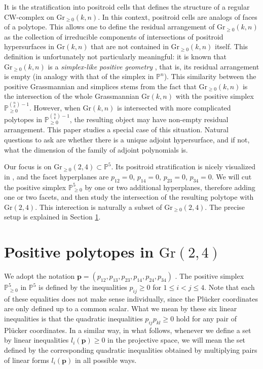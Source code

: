 \documentclass[12pt]{extarticle}
\theoremstyle{definition}
\begin{document}
It is the stratification into positroid cells that defines the structure of a regular CW-complex on $\mathrm{Gr}_{\geq 0}(k,n)$. In this context, positroid cells are analogs of faces of a polytope. This allows one to define the residual arrangement of $\mathrm{Gr}_{\geq 0}(k,n)$ as the collection of irreducible components of intersections of positroid hypersurfaces in $\mathrm{Gr}(k,n)$ that are not contained in $\mathrm{Gr}_{\geq 0}(k,n)$ itself. This definition is unfortunately not particularly meaningful: it is known that $\mathrm{Gr}_{\geq 0}(k,n)$ is a \emph{simplex-like positive geometry} \cite[Section 5.5.2]{arkani2017positive}, that is, its residual arrangement is empty (in analogy with that of the simplex in $\mathbb{P}^n$). This similarity between the positive Grassmannian and simplices stems from the fact that $\mathrm{Gr}_{\geq 0}(k,n)$ is the intersection of the whole Grassmannian $\mathrm{Gr}(k,n)$ with the positive simplex $\mathbb{P}^{\binom{n}{k}-1}_{\geq 0}$. However, when $\mathrm{Gr}(k,n)$ is intersected with more complicated polytopes in $\mathbb{P}^{\binom{n}{k}-1}_{\geq 0}$, the resulting object may have non-empty residual arrangement. This paper studies a special case of this situation. Natural questions to ask are whether there is a unique adjoint hypersurface, and if not, what the dimension of the family of adjoint polynomials is. 

Our focus is on $\mathrm{Gr}_{\geq 0}(2,4) \subset \mathbb{P}^5$. Its positroid stratification is nicely visualized in \cite[Appendix A]{williams2005combinatorial}, and the facet hyperplanes are $p_{12} = 0$, $p_{14}=0$, $p_{23}=0$, $p_{34} = 0$. We will cut the positive simplex $\mathbb{P}^5_{\geq 0}$ by one or two additional hyperplanes, therefore adding one or two facets, and then study the intersection of the resulting polytope with $\mathrm{Gr}(2,4)$. This interection is naturally a subset of $\mathrm{Gr}_{\geq 0}(2,4)$. The precise setup is explained in Section \ref{sec:3}.
    


\section{Positive polytopes in $\mathrm{Gr}(2,4)$} \label{sec:3}

We adopt the notation $\mathbf{p}=(p_{12},p_{13}, p_{23}, p_{14}, p_{24}, p_{34})$ . The positive simplex $\mathbb{P}^5_{\geq 0}$ in $\mathbb{P}^5$ is defined by the inequalities $p_{ij}\geq 0$ for $1\leq i < j \leq 4$. Note that each of these equalities does not make sense individually, since the Pl\"ucker coordinates are only defined up to a common scalar. What we mean by these six linear inequalities is that the quadratic inequalities $p_{ij}p_{kl}\geq 0$ hold for any pair of Pl\"ucker coordinates. In a similar way, in what follows, whenever we define a set by linear inequalities $l_i(\mathbf{p})\geq 0$ in the projective space, we will mean the set defined by the corresponding quadratic inequalities obtained by multiplying pairs of linear forms $l_i(\mathbf{p})$ in all possible ways. 
\end{document}
